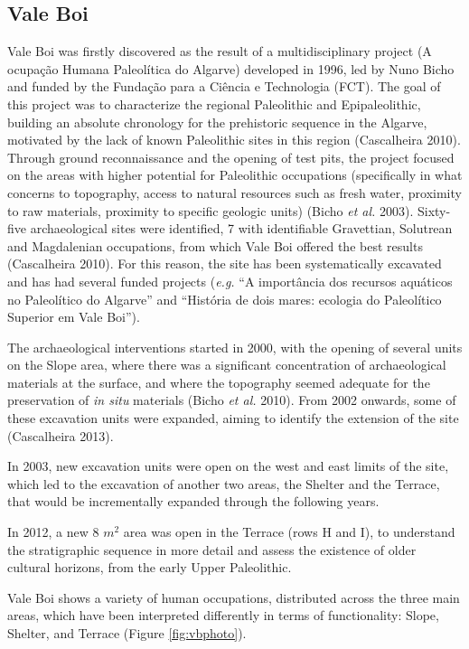 \documentclass[12pt,twoside]{reedthesis}
\begin{document}
\hypertarget{vale-boi-1}{%
\subsection{Vale Boi}\label{vale-boi-1}}

Vale Boi was firstly discovered as the result of a multidisciplinary project (A ocupação Humana Paleolítica do Algarve) developed in 1996, led by Nuno Bicho and funded by the Fundação para a Ciência e Technologia (FCT). The goal of this project was to characterize the regional Paleolithic and Epipaleolithic, building an absolute chronology for the prehistoric sequence in the Algarve, motivated by the lack of known Paleolithic sites in this region (Cascalheira 2010). Through ground reconnaissance and the opening of test pits, the project focused on the areas with higher potential for Paleolithic occupations (specifically in what concerns to topography, access to natural resources such as fresh water, proximity to raw materials, proximity to specific geologic units) (Bicho \emph{et al.} 2003). Sixty-five archaeological sites were identified, 7 with identifiable Gravettian, Solutrean and Magdalenian occupations, from which Vale Boi offered the best results (Cascalheira 2010). For this reason, the site has been systematically excavated and has had several funded projects (\emph{e.g.} ``A importância dos recursos aquáticos no Paleolítico do Algarve'' and ``História de dois mares: ecologia do Paleolítico Superior em Vale Boi'').

The archaeological interventions started in 2000, with the opening of several units on the Slope area, where there was a significant concentration of archaeological materials at the surface, and where the topography seemed adequate for the preservation of \emph{in situ} materials (Bicho \emph{et al.} 2010). From 2002 onwards, some of these excavation units were expanded, aiming to identify the extension of the site (Cascalheira 2013).

In 2003, new excavation units were open on the west and east limits of the site, which led to the excavation of another two areas, the Shelter and the Terrace, that would be incrementally expanded through the following years.

In 2012, a new 8 \(m^2\) area was open in the Terrace (rows H and I), to understand the stratigraphic sequence in more detail and assess the existence of older cultural horizons, from the early Upper Paleolithic.

Vale Boi shows a variety of human occupations, distributed across the three main areas, which have been interpreted differently in terms of functionality: Slope, Shelter, and Terrace (Figure \ref{fig:vbphoto}).
\end{document}
